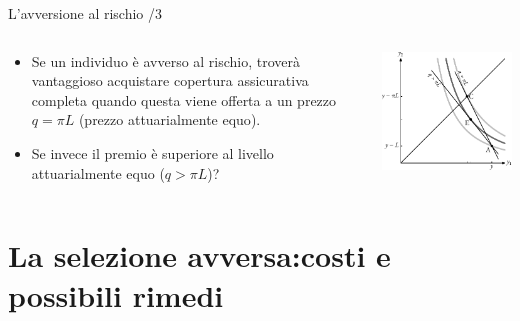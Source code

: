 \documentclass[aspectratio=64,12pt]{beamer}
\begin{document}
\begin{frame}{L'avversione al rischio /3}
\begin{columns}
\begin{column}{.5\columnwidth}
\begin{itemize}
\item Se un individuo è avverso al rischio, troverà vantaggioso acquistare
copertura assicurativa completa quando questa viene offerta a un prezzo
$q=\pi L$ (prezzo \alert{attuarialmente equo}).
\item Se invece il premio è superiore al livello attuarialmente equo ($q>\pi L$)?
\end{itemize}
\end{column}

\begin{column}{.5\columnwidth}
\begin{center}
\includegraphics[width=.9\textwidth]{./figure/rischio-3.pdf}
\end{center}
\end{column}
\end{columns}
\end{frame}


\section{La selezione avversa:\newline costi e possibili rimedi}
\end{document}
